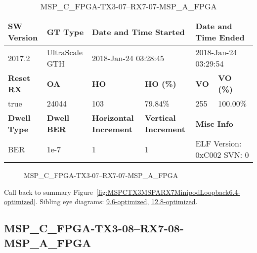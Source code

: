 \begin{table}[h]
\centering
\caption{MSP\_C\_FPGA-TX3-07--RX7-07-MSP\_A\_FPGA}
\label{tab:MSPCFPGATX307RX707MSPAFPGA6.4-optimized}
\begin{tabular}{@{}|l|l|l|l|l|l|@{}}
\toprule
\textbf{SW Version}                & \textbf{GT Type}   & \multicolumn{2}{l|}{\textbf{Date and Time Started}}            & \multicolumn{2}{l|}{\textbf{Date and Time Ended}}        \\ \midrule
2017.2                       & UltraScale GTH          & \multicolumn{2}{l|}{2018-Jan-24 03:28:45}                   & \multicolumn{2}{l|}{2018-Jan-24 03:29:54}               \\ \midrule
\textbf{Reset RX}                  & \textbf{OA} & \textbf{HO}   & \textbf{HO (\%)} & \textbf{VO} & \textbf{VO (\%)} \\ \midrule
true & 24044        & 103          & 79.84\%        & 255        & 100.00\%       \\ \midrule
\textbf{Dwell Type}                & \textbf{Dwell BER} & \textbf{Horizontal Increment} & \textbf{Vertical Increment}    & \multicolumn{2}{l|}{\textbf{Misc Info}}                  \\ \midrule
BER                            & 1e-7        & 1        & 1           & \multicolumn{2}{l|}{ELF Version: 0xC002 SVN: 0}                         \\ \bottomrule
\end{tabular}
\end{table}

\begin{figure}[h]
\caption{MSP\_C\_FPGA-TX3-07--RX7-07-MSP\_A\_FPGA} \label{fig:MSPCFPGATX307RX707MSPAFPGA6.4-optimized}
\end{figure}

Call back to summary Figure~\ref{fig:MSPCTX3MSPARX7MinipodLoopback6.4-optimized}.
Sibling eye diagrams: \hyperref[sec:MSPCFPGATX307RX707MSPAFPGA9.6-optimized]{9.6-optimized}, \hyperref[sec:MSPCFPGATX307RX707MSPAFPGA12.8-optimized]{12.8-optimized}.

\clearpage
\newpage


\subsection{MSP\_C\_FPGA-TX3-08--RX7-08-MSP\_A\_FPGA}\label{sec:MSPCFPGATX308RX708MSPAFPGA6.4-optimized}

